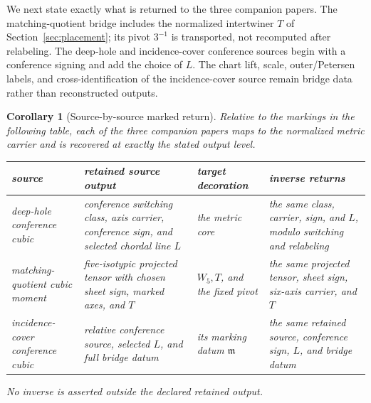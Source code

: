 \documentclass[11pt]{article}
\newtheorem{corollary}[theorem]{Corollary}
\theoremstyle{definition}
\theoremstyle{remark}
\begin{document}
We next state exactly what is returned to the three companion papers.  The
matching-quotient bridge \cite{RuddFactorization2026} includes the normalized
intertwiner \(T\) of Section~\ref{sec:placement}; its pivot \(3^{-1}\) is
transported, not recomputed after relabeling.  The deep-hole and
incidence-cover conference sources
\cite{RuddRigidity2026,RuddPassages2026} begin with a conference signing and
add the choice of \(L\).  The chart lift, scale, outer/Petersen labels, and
cross-identification of the incidence-cover source \cite{RuddPassages2026}
remain bridge data rather than reconstructed outputs.

\begin{corollary}[Source-by-source marked return]
\label{cor:source-by-source-return}
Relative to the markings in the following table, each of the three companion
papers \cite{RuddRigidity2026,RuddFactorization2026,RuddPassages2026} maps
to the normalized metric carrier and is recovered at exactly the stated
output level.
\begin{center}
\small
\renewcommand{\arraystretch}{1.15}
\begin{tabular}{@{}>{\raggedright\arraybackslash}p{}
  >{\raggedright\arraybackslash}p{}
  >{\raggedright\arraybackslash}p{}
  >{\raggedright\arraybackslash}p{}@{}}
\toprule
source & retained source output & target decoration & inverse returns\\
\midrule
deep-hole conference cubic \cite{RuddRigidity2026} & conference switching
  class, axis carrier, conference sign, and selected chordal line \(L\) & the
  metric core & the same class, carrier, sign, and \(L\), modulo
  switching and relabeling\\
matching-quotient cubic moment \cite{RuddFactorization2026} & five-isotypic
  projected tensor with chosen sheet sign, marked axes, and \(T\) &
  \(W_5,T\), and the fixed pivot & the same projected tensor, sheet sign,
  six-axis carrier, and \(T\)\\
incidence-cover conference cubic \cite{RuddPassages2026} & relative conference
  source, selected \(L\), and full bridge datum &
  its marking datum \(\mathfrak m\) & the same retained source, conference sign,
  \(L\), and bridge datum\\
\bottomrule
\end{tabular}
\end{center}
No inverse is asserted outside the declared retained output.
\end{corollary}
\end{document}
